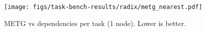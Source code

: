 \begin{figure}[t]
\centering
\texttt{[image: figs/task-bench-results/radix/metg\_nearest.pdf]}
\caption{METG vs dependencies per task (1 node). Lower is better.\label{fig:radix}}
\end{figure}
